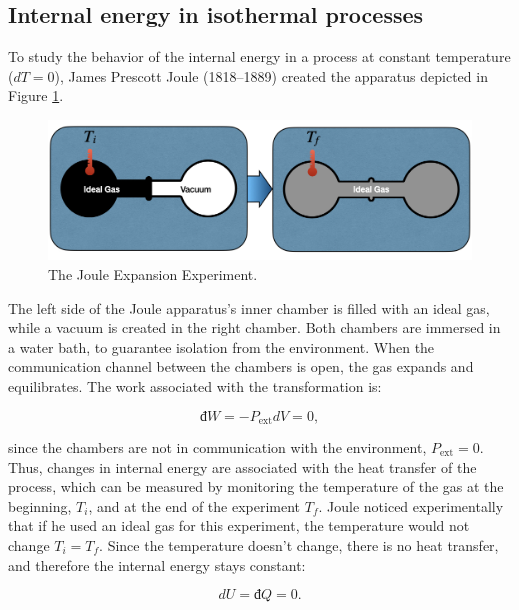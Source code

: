 \documentclass[
  9pt,
]{extbook}
\theoremstyle{definition}
\theoremstyle{definition}
\theoremstyle{definition}
\theoremstyle{remark}
\begin{document}
\hypertarget{isothermalE}{%
\subsection{Internal energy in isothermal processes}\label{isothermalE}}

To study the behavior of the internal energy in a process at constant temperature (\(dT=0\)), James Prescott Joule (1818--1889) created the apparatus depicted in Figure \ref{fig:FigJexp}.

\begin{figure}

{\centering \includegraphics[width=0.8\linewidth]{./img/OEP_Figures.006} 

}

\caption{The Joule Expansion Experiment.}\label{fig:FigJexp}
\end{figure}

The left side of the Joule apparatus's inner chamber is filled with an ideal gas, while a vacuum is created in the right chamber. Both chambers are immersed in a water bath, to guarantee isolation from the environment. When the communication channel between the chambers is open, the gas expands and equilibrates. The work associated with the transformation is:

\begin{equation}
  đ W=-P_{\text{ext}}dV = 0,
  \label{eq:JexpW}
\end{equation}

since the chambers are not in communication with the environment, \(P_{\text{ext}}=0\). Thus, changes in internal energy are associated with the heat transfer of the process, which can be measured by monitoring the temperature of the gas at the beginning, \(T_i\), and at the end of the experiment \(T_f\). Joule noticed experimentally that if he used an ideal gas for this experiment, the temperature would not change \(T_i = T_f\). Since the temperature doesn't change, there is no heat transfer, and therefore the internal energy stays constant:

\begin{equation}
  dU = đ Q = 0.
  \label{eq:JexpQU}
\end{equation}
\end{document}
